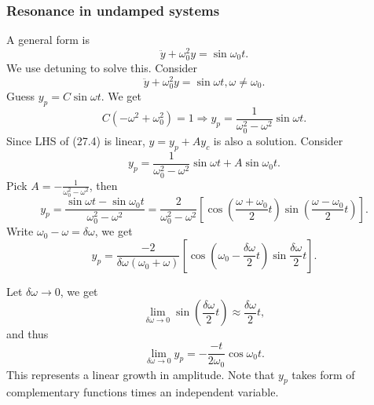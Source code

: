 \documentclass[a4paper]{article}
\begin{document}
      \subsubsection{Resonance in undamped systems}
      A general form is
      \begin{equation}
        \ddot{y}+\omega_0^2 y = \sin \omega_0 t.
      \end{equation}
      We use detuning to solve this. Consider 
      \begin{equation}
        \ddot{y}+\omega_0^2 y = \sin \omega t, \omega\neq \omega_0.
      \end{equation}
      Guess $ y_p=C \sin \omega t $. We get 
      \[
          C(-\omega^2+\omega_0^2)=1 \Longrightarrow y_p = \frac{1}{\omega_0^2-\omega^2}\sin \omega t
      .\]
      Since LHS of (27.4) is linear, $ y=y_p+Ay_c $ is also a solution. Consider 
      \[
          y_p = \frac{1}{\omega_0^2-\omega^2}\sin \omega t + A \sin \omega_0 t
      .\]
      Pick $A=-\frac{1}{\omega_0^2-\omega^2}$, then 
      \[
          y_p = \frac{\sin \omega t-\sin \omega_0 t}{\omega_0^2-\omega^2} = \frac{2}{\omega_0^2-\omega^2}\left[ \cos \left( \frac{\omega+\omega_0}{2}t \right)\sin \left( \frac{\omega-\omega_0}{2}t \right) \right]
      .\] 
      Write $ \omega_0-\omega = \delta \omega $, we get 
      \[
          y_p = \frac{-2}{\delta \omega(\omega_0+\omega)}\left[ \cos \left( \omega_0-\frac{\delta \omega}{2}t \right) \sin \frac{\delta \omega}{2}t \right]
      .\]
      \begin{center}
      \end{center}
      Let $ \delta \omega\to 0 $, we get 
      \[
          \lim_{\delta \omega \to 0} \sin \left( \frac{\delta \omega}{2}t \right) \approx \frac{\delta \omega}{2}t
      ,\]
      and thus 
      \[
          \lim_{\delta \omega \to 0} y_p = -\frac{-t}{2\omega_0}\cos \omega_0 t
      .\]
      This represents a linear growth in amplitude. Note that $y_p$ takes form of complementary functions times an independent variable.
\end{document}
